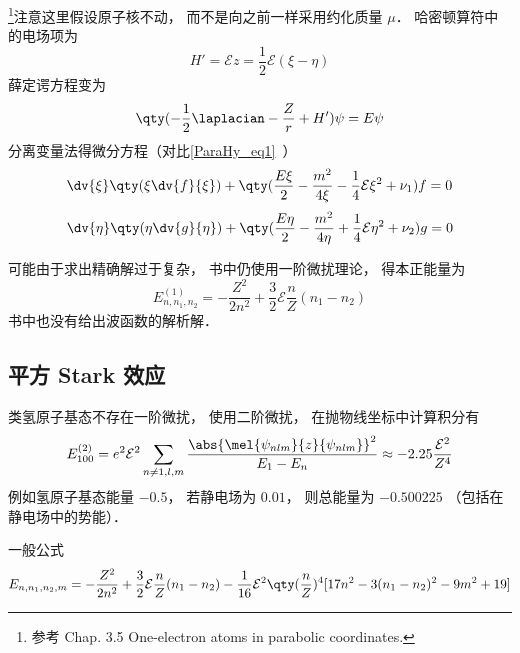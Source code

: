 
\begin{issues}
\issueDraft
\end{issues}


\footnote{参考 \cite{Brandsen} Chap. 3.5 One-electron atoms in parabolic coordinates.}注意这里假设原子核不动， 而不是向之前一样采用约化质量 $\mu$． 哈密顿算符中的电场项为
\begin{equation}
H' = \mathcal Ez = \frac12 \mathcal E (\xi - \eta)
\end{equation}
薛定谔方程变为
\begin{equation}
\qty(-\frac12 \laplacian - \frac{Z}{r} + H')\psi = E\psi
\end{equation}
分离变量法得微分方程（对比\autoref{ParaHy_eq1}~）
\begin{equation}
\dv{\xi} \qty(\xi \dv{f}{\xi}) + \qty(\frac{E \xi}{2} - \frac{m^2}{4\xi} -\frac14\mathcal E \xi^2 + \nu_1) f = 0
\end{equation}
\begin{equation}
\dv{\eta}\qty(\eta \dv{g}{\eta}) + \qty(\frac{E\eta}{2} - \frac{m^2}{4\eta} +\frac14\mathcal E \eta^2 + \nu_2)g = 0
\end{equation}

可能由于求出精确解过于复杂， 书中仍使用一阶微扰理论， 得本正能量为
\begin{equation}
E_{n,n_1,n_2}^{(1)} = -\frac{Z^2}{2n^2} + \frac32 \mathcal E \frac{n}{Z}(n_1 - n_2)
\end{equation}
书中也没有给出波函数的解析解．

\subsection{平方 Stark 效应}
类氢原子基态不存在一阶微扰， 使用二阶微扰， 在抛物线坐标中计算积分有
\begin{equation}
E_{100}^{(2)} = e^2\mathcal E^2 \sum_{n\ne 1, l, m} \frac{\abs{\mel{\psi_{nlm}}{z}{\psi_{nlm}}}^2}{E_1 - E_n}
\approx - 2.25\frac{\mathcal E^2}{Z^4}
\end{equation}
例如氢原子基态能量 $-0.5$， 若静电场为 $0.01$， 则总能量为 $-0.500225$ （包括在静电场中的势能）．

一般公式
\begin{equation}
E_{n,n_1,n_2,m} = -\frac{Z^2}{2n^2} + \frac32 \mathcal E \frac{n}{Z} (n_1-n_2)
-\frac{1}{16}\mathcal E^2 \qty(\frac{n}{Z})^4 [17n^2-3(n_1-n_2)^2-9m^2+19]
\end{equation}
